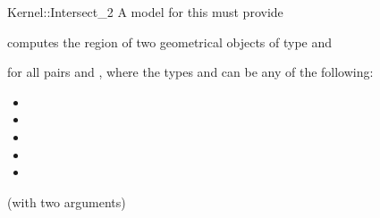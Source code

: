 \begin{ccRefFunctionObjectConcept}{Kernel::Intersect_2}
A model for this must provide


{computes the  region of two geometrical objects of type 
 and }

for all pairs  and , where
the types  and  can be any of the
following:
\begin{itemize}
\item {}
\item {}
\item {}
\item {}
\item {}
\end{itemize}

\ccRefines
{} (with two arguments)

\ccSeeAlso
{}\\

\end{ccRefFunctionObjectConcept}
